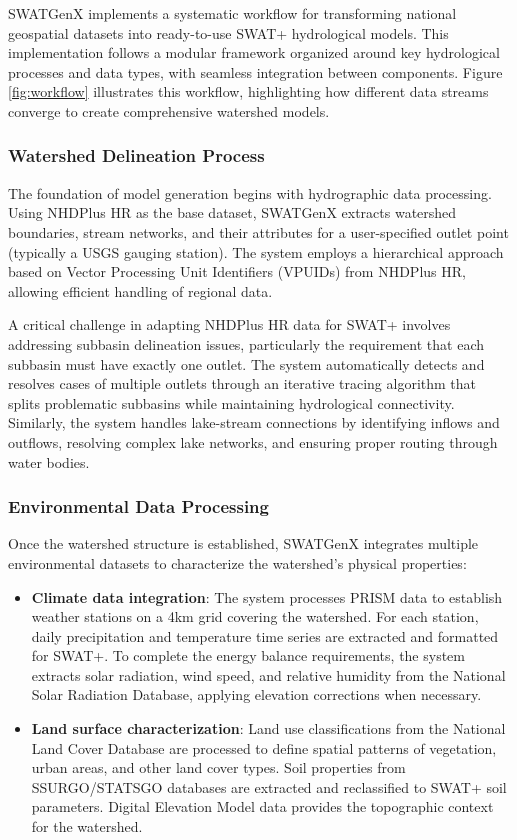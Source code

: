 \documentclass[final,3p,times]{elsarticle}
\begin{document}
SWATGenX implements a systematic workflow for transforming national geospatial datasets into ready-to-use SWAT+ hydrological models. This implementation follows a modular framework organized around key hydrological processes and data types, with seamless integration between components. Figure \ref{fig:workflow} illustrates this workflow, highlighting how different data streams converge to create comprehensive watershed models.

\subsubsection{Watershed Delineation Process}
The foundation of model generation begins with hydrographic data processing. Using NHDPlus HR as the base dataset, SWATGenX extracts watershed boundaries, stream networks, and their attributes for a user-specified outlet point (typically a USGS gauging station). The system employs a hierarchical approach based on Vector Processing Unit Identifiers (VPUIDs) from NHDPlus HR, allowing efficient handling of regional data.

A critical challenge in adapting NHDPlus HR data for SWAT+ involves addressing subbasin delineation issues, particularly the requirement that each subbasin must have exactly one outlet. The system automatically detects and resolves cases of multiple outlets through an iterative tracing algorithm that splits problematic subbasins while maintaining hydrological connectivity. Similarly, the system handles lake-stream connections by identifying inflows and outflows, resolving complex lake networks, and ensuring proper routing through water bodies.

\subsubsection{Environmental Data Processing}
Once the watershed structure is established, SWATGenX integrates multiple environmental datasets to characterize the watershed's physical properties:

\begin{itemize}
    \item \textbf{Climate data integration}: The system processes PRISM data to establish weather stations on a 4km grid covering the watershed. For each station, daily precipitation and temperature time series are extracted and formatted for SWAT+. To complete the energy balance requirements, the system extracts solar radiation, wind speed, and relative humidity from the National Solar Radiation Database, applying elevation corrections when necessary.
    
    \item \textbf{Land surface characterization}: Land use classifications from the National Land Cover Database are processed to define spatial patterns of vegetation, urban areas, and other land cover types. Soil properties from SSURGO/STATSGO databases are extracted and reclassified to SWAT+ soil parameters. Digital Elevation Model data provides the topographic context for the watershed.
\end{itemize}
\end{document}
